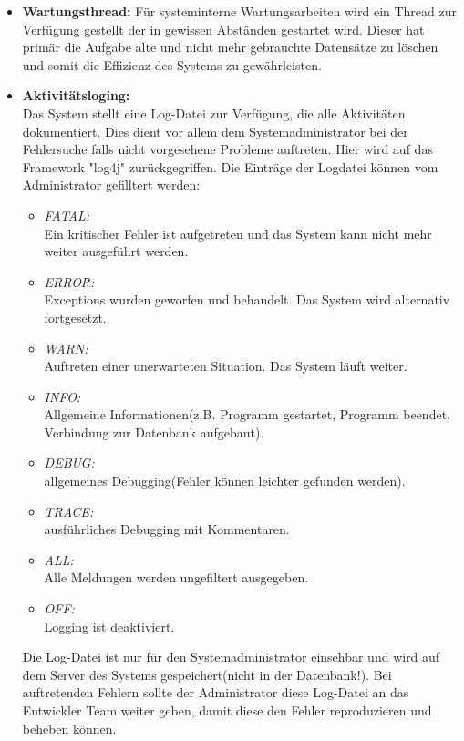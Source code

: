 \begin{itemize}
			\item \textbf{Wartungsthread:}
			Für systeminterne Wartungsarbeiten wird ein Thread zur Verfügung gestellt der in gewissen Abständen gestartet wird. Dieser hat primär die Aufgabe alte und nicht mehr gebrauchte Datensätze zu löschen und somit die Effizienz des Systems zu gewährleisten.
			
			\item \textbf{Aktivitätsloging:}\\
			Das System stellt eine Log-Datei zur Verfügung, die alle Aktivitäten dokumentiert. Dies dient vor allem dem Systemadministrator bei der Fehlersuche falls nicht vorgesehene Probleme auftreten. Hier wird auf das Framework "log4j" zurückgegriffen. Die Einträge der Logdatei können vom Administrator gefilltert werden:
			\begin{itemize}
				\item \emph{FATAL:}\\
				Ein kritischer Fehler ist aufgetreten und das System kann nicht mehr weiter ausgeführt werden.
				\item \emph{ERROR:}\\
				Exceptions wurden geworfen und behandelt. Das System wird alternativ fortgesetzt.
				\item \emph{WARN:}\\
				Auftreten einer unerwarteten Situation. Das System läuft weiter.
				\item \emph{INFO:}\\
				Allgemeine Informationen(z.B. Programm gestartet, Programm beendet, Verbindung zur Datenbank aufgebaut).
				\item \emph{DEBUG:}\\
				allgemeines Debugging(Fehler können leichter gefunden werden).
				\item \emph{TRACE:}\\
				ausführliches Debugging mit Kommentaren.
				\item \emph{ALL:}\\
				Alle Meldungen werden ungefiltert ausgegeben.
				\item \emph{OFF:}\\
				Logging ist deaktiviert.
			\end{itemize}
			
			Die Log-Datei ist nur für den Systemadministrator einsehbar und wird auf dem Server des Systems gespeichert(nicht in der Datenbank!). Bei auftretenden Fehlern sollte der Administrator diese Log-Datei an das Entwickler Team weiter geben, damit diese den Fehler reproduzieren und beheben können.
			
		\end{itemize} 
	
